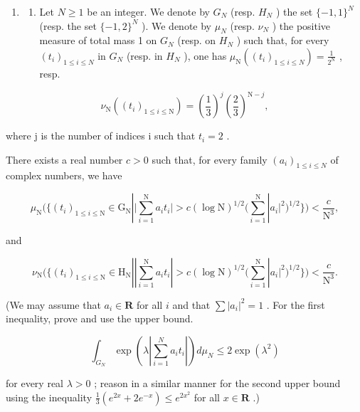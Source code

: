 \begin{enumerate}
\def\labelenumi{\arabic{enumi})}
\setcounter{enumi}{24}
\tightlist
\item
  \begin{enumerate}
  \def\labelenumii{\alph{enumii})}
  \tightlist
  \item
    Let \(N \geqslant 1\) be an integer. We denote by \(G_{N}\) (resp. \(H_{N}\) ) the set \(\{-1,1\}^{N}\) (resp. the set \(\{-1,2\}^{N}\) ). We denote by \(\mu_{N}\) (resp. \(\nu_{N}\) ) the positive measure of total mass 1 on \(G_{N}\) (resp. on \(H_{N}\) ) such that, for every \((t_{i})_{1 \leqslant i \leqslant N}\) in \(G_{N}\) (resp. in \(H_{N}\) ), one has \(\mu_{\mathrm{N}}((t_{i})_{1 \leqslant i \leqslant N}) = \frac{1}{2^{\mathrm{N}}}\) , resp.
  \end{enumerate}
\end{enumerate}

\[
\nu_ {\mathrm{N}} ((t _ {i}) _ {1 \leqslant i \leqslant \mathrm{N}}) = \left(\frac {1}{3}\right) ^ {j} \left(\frac {2}{3}\right) ^ {\mathrm{N} - j},
\]

where j is the number of indices i such that \(t_{i}=2\) .

There exists a real number \(c > 0\) such that, for every family \((a_{i})_{1\leqslant i\leqslant N}\) of complex numbers, we have

\[
\mu_ {\mathrm{N}} \Big (\Big \{(t _ {i}) _ {1 \leqslant i \leqslant \mathrm{N}} \in \mathrm{G} _ {\mathrm{N}} | \Big | \sum_ {i = 1} ^ {\mathrm{N}} a _ {i} t _ {i} \Big | > c (\log \mathrm{N}) ^ {1 / 2} \Big (\sum_ {i = 1} ^ {\mathrm{N}} | a _ {i} | ^ {2} \Big) ^ {1 / 2} \Big \} \Big) <   \frac {c}{\mathrm{N} ^ {3}},
\]

and

\[
\nu_ {\mathrm{N}} \Big (\Big \{(t _ {i}) _ {1 \leqslant i \leqslant \mathrm{N}} \in \mathrm{H} _ {\mathrm{N}} | \left| \sum_ {i = 1} ^ {\mathrm{N}} a _ {i} t _ {i} \right| > c (\log \mathrm{N}) ^ {1 / 2} \Big (\sum_ {i = 1} ^ {\mathrm{N}} | a _ {i} | ^ {2} \Big) ^ {1 / 2} \Big \} \Big) <   \frac {c}{\mathrm{N} ^ {3}}.
\]

(We may assume that \(a_{i} \in \mathbf{R}\) for all \(i\) and that \(\sum |a_{i}|^{2} = 1\) . For the first inequality, prove and use the upper bound.

\[
\int_ {G _ {N}} \exp \left(\lambda \left| \sum_ {i = 1} ^ {N} a _ {i} t _ {i} \right|\right) d \mu_ {N} \leqslant 2 \exp (\lambda^ {2})
\]

for every real \(\lambda > 0\) ; reason in a similar manner for the second upper bound using the inequality \(\frac{1}{3}(e^{2x} + 2e^{-x}) \leqslant e^{2x^2}\) for all \(x \in \mathbf{R}\) .)

